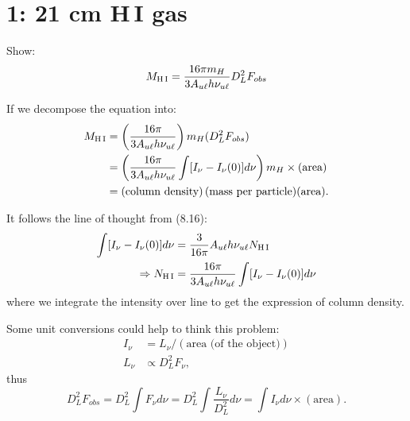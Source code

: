 \documentclass[12pt,letterpaper]{article}
\newcommand{\hi}{\textrm{H\,I}}
\begin{document}
\section*{1: 21 cm {\hi} gas}
Show:
\begin{equation}
    M_{\hi} = \frac{16 \pi m_{H}}{3 A_{u \ell} h \nu_{u \ell}} D_{L}^2 F_{obs}
\end{equation}

If we decompose the equation into:
\begin{equation*}
    \begin{split}
        M_{\hi} &=
        \left( \frac{16 \pi}{3 A_{u \ell} h \nu_{u \ell}} \right)
        m_{H} 
        (D_{L}^2 F_{obs}) \\
        &= 
        \left( \frac{16 \pi}{3 A_{u \ell} h \nu_{u \ell}} 
        \int [I_\nu - I_\nu(0)]d\nu
        \right)
        m_{H} 
        \times
        (\textrm{area})\\
        &= 
        \left( \textrm{column density}\right) (\textrm{mass per particle})(\textrm{area}).
    \end{split}
\end{equation*}

It follows the line of thought from  (8.16):
\begin{equation}
    \begin{split}
        \int [I_\nu - I_\nu(0)] d\nu &= 
        \frac{3}{16 \pi} A_{u \ell} h \nu_{u \ell} N_{\hi}\\
        \Rightarrow 
        N_{\hi} &= \frac{16 \pi}{3 A_{u\ell} h \nu_{u\ell}} 
        \int [I_{\nu} - I_{\nu}(0)] d\nu
    \end{split}
\end{equation}
where we integrate the intensity over line to get the expression of column density.

Some unit conversions could help to think this problem:
\begin{equation*}
    \begin{split}
        I_\nu &= L_{\nu} / (\textrm{area (of the object)})\\
        L_{\nu} &\propto D_{L}^2 F_{\nu},
    \end{split}
\end{equation*}
thus
\begin{equation}
    D_{L}^2 F_{obs} = D_{L}^2 \int F_{\nu} d\nu
    = D_{L}^2 \int \frac{L_{\nu}}{D_{L}^2} d\nu
    = \int I_\nu d\nu \times (\textrm{area}).
\end{equation}
\end{document}

